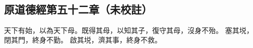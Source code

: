 ﻿%
%

\chapter{~}

\section{原道德經第五十二章（未校註）}

\begin{withgezhu}

\zhsong


天下有始，以為天下母。既得其母，以知其子，復守其母，沒身不殆。
\textcolor{tongjia-color}{塞其㙂}，閉其門，終身不勤。
\textcolor{tongjia-color}{啟其㙂}，濟其事，終身不救。

\end{withgezhu}
